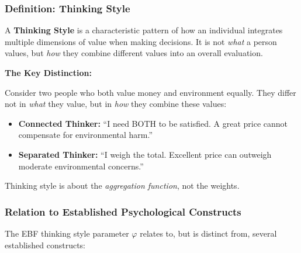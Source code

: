 \subsubsection{Definition: Thinking Style}

\begin{definition}
\label{def:thinking-style}
A \textbf{Thinking Style} is a characteristic pattern of how an individual integrates multiple dimensions of value when making decisions. It is not \textit{what} a person values, but \textit{how} they combine different values into an overall evaluation.
\end{definition}

\begin{intuition}
\textbf{The Key Distinction:}

Consider two people who both value money and environment equally. They differ not in \textit{what} they value, but in \textit{how} they combine these values:

\begin{itemize}
\item \textbf{Connected Thinker:} ``I need BOTH to be satisfied. A great price cannot compensate for environmental harm.''
\item \textbf{Separated Thinker:} ``I weigh the total. Excellent price can outweigh moderate environmental concerns.''
\end{itemize}

Thinking style is about the \textit{aggregation function}, not the weights.
\end{intuition}

\subsubsection{Relation to Established Psychological Constructs}

The EBF thinking style parameter $\varphi$ relates to, but is distinct from, several established constructs:


